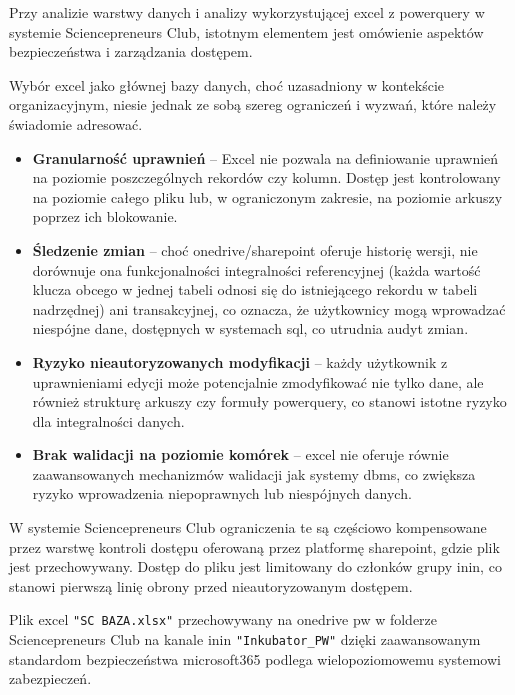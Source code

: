 Przy analizie warstwy danych i analizy wykorzystującej \gls{excel} z \gls{powerquery} w systemie Sciencepreneurs Club, istotnym elementem jest omówienie aspektów bezpieczeństwa i zarządzania dostępem. 

Wybór \gls{excel} jako głównej bazy danych, choć uzasadniony w kontekście organizacyjnym, niesie jednak ze sobą szereg ograniczeń i wyzwań, które należy świadomie adresować.

\begin{itemize}
\item \textbf{Granularność uprawnień} – Excel nie pozwala na definiowanie uprawnień na poziomie poszczególnych rekordów czy kolumn. Dostęp jest kontrolowany na poziomie całego pliku lub, w ograniczonym zakresie, na poziomie arkuszy poprzez ich blokowanie. \cite{microsoft_excel_blocking_2025}
\item \textbf{Śledzenie zmian} – choć \gls{onedrive}/\gls{sharepoint} oferuje historię wersji, nie dorównuje ona funkcjonalności integralności referencyjnej (każda wartość klucza obcego w jednej tabeli odnosi się do istniejącego rekordu w tabeli nadrzędnej) ani transakcyjnej, co oznacza, że użytkownicy mogą wprowadzać niespójne dane, dostępnych w systemach \gls{sql}, co utrudnia audyt zmian. \cite{microsoft_office_versions_2025}
\item \textbf{Ryzyko nieautoryzowanych modyfikacji} – każdy użytkownik z uprawnieniami edycji może potencjalnie zmodyfikować nie tylko dane, ale również strukturę arkuszy czy formuły \gls{powerquery}, co stanowi istotne ryzyko dla integralności danych. \cite{Microsoft365Groups2025}
\item \textbf{Brak walidacji na poziomie komórek} – \gls{excel} nie oferuje równie zaawansowanych mechanizmów walidacji jak systemy \gls{dbms}, co zwiększa ryzyko wprowadzenia niepoprawnych lub niespójnych danych. \cite{microsoft_excel_validation_2025}
\end{itemize}

W systemie Sciencepreneurs Club ograniczenia te są częściowo kompensowane przez warstwę kontroli dostępu oferowaną przez platformę \gls{sharepoint}, gdzie plik jest przechowywany. Dostęp do pliku jest limitowany do członków grupy \gls{inin}, co stanowi pierwszą linię obrony przed nieautoryzowanym dostępem.

Plik \gls{excel} \texttt{"SC BAZA.xlsx"} przechowywany na \gls{onedrive} \gls{pw} w folderze Sciencepreneurs Club na kanale \gls{inin} \texttt{"Inkubator\_PW"} dzięki zaawansowanym standardom bezpieczeństwa \gls{microsoft365} podlega wielopoziomowemu systemowi zabezpieczeń. \cite{Microsoft365Groups2025}

